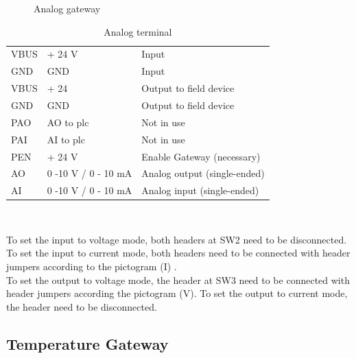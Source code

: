 \documentclass[10pt,letterpaper]{article}
\begin{document}
\begin{figure} [h]
\begin{subfigure}{0.49\textwidth}
				\end{subfigure}
				\caption{Analog gateway}
		\end{figure}
		

		\begin{table}[htpb!]
			\centering
			\caption{Analog terminal}
			\label{tab:a-term}
			\begin{tabular}{lll}
			VBUS 	& + 24 V 	& Input \\
			GND 	& GND 		& Input \\
			VBUS	& + 24		& Output to field device \\
			GND		& GND 		& Output to field device \\
			PAO 	& AO to plc & Not in use \\
			PAI 	& AI to plc & Not in use \\
			PEN 	& + 24 V	& Enable Gateway (necessary) \\
			AO 		& 0 -10 V / 0 - 10 mA & Analog output (single-ended) \\
			AI 		& 0 -10 V / 0 - 10 mA & Analog input (single-ended)\\
	
			\end{tabular}\\ 
		\end{table}

		To set the input to voltage mode, both headers at SW2 need to be disconnected. 
		To set the input to current mode, both headers need to be connected with header jumpers according to the pictogram (I) .\\
		To set the output to voltage mode, the header at SW3 need to be connected with header jumpers according the pictogram (V). 
		To set the output to current mode, the header need to be disconnected.

\newpage
		\subsection{Temperature Gateway}
\end{document}
